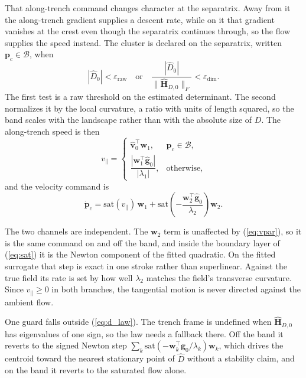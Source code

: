 \documentclass[lettersize,journal]{IEEEtran}
\begin{document}
That along-trench command changes character at the separatrix. Away from
it the along-trench gradient supplies a descent rate, while on it that
gradient vanishes at the crest even though the separatrix continues
through, so the flow supplies the speed instead. The cluster is declared
on the separatrix,
written $\mathbf{p}_c \in \mathcal{B}$, when
\begin{equation}
    |\hat{D}_0| < \varepsilon_{\mathrm{raw}}
    \quad\text{or}\quad
    \frac{|\hat{D}_0|}{\|\hat{\mathbf{H}}_{D,0}\|_F}
        < \varepsilon_{\dim}.
    \label{eq:flow_band}
\end{equation}
The first test is a raw threshold on the estimated determinant. The
second normalizes it by the local curvature, a ratio with units of length
squared, so the band scales with the landscape rather than with the
absolute size of $D$. The along-trench speed is then
\begin{equation}
    v_\parallel =
    \begin{cases}
        \hat{\mathbf{v}}_0^\top \mathbf{w}_1,
            & \mathbf{p}_c \in \mathcal{B}, \\[6pt]
        \dfrac{|\mathbf{w}_1^\top \hat{\mathbf{g}}_0|}{|\lambda_1|},
            & \text{otherwise},
    \end{cases}
    \label{eq:vpar}
\end{equation}
and the velocity command is
\begin{equation}
    \dot{\mathbf{p}}_c =
    \mathrm{sat}(v_\parallel)\,\mathbf{w}_1
    + \mathrm{sat}\!\left(-\frac{\mathbf{w}_2^\top
      \hat{\mathbf{g}}_0}{\lambda_2}\right)\mathbf{w}_2.
    \label{eq:d_law}
\end{equation}

The two channels are independent. The $\mathbf{w}_2$ term is unaffected
by (\ref{eq:vpar}), so it is the same command on and off the band, and
inside the boundary layer of (\ref{eq:sat}) it is the Newton component of
the fitted quadratic. On the fitted surrogate that step is exact in one
stroke rather than superlinear. Against the true field its rate is set by
how well $\lambda_2$ matches the field's transverse curvature. Since $v_\parallel \geq
0$ in both branches, the tangential motion is never directed against the
ambient flow. 

One guard falls outside (\ref{eq:d_law}).
The trench frame is undefined when $\hat{\mathbf{H}}_{D,0}$ has
eigenvalues of one sign, so the law needs a fallback there. Off the
band it reverts to the signed Newton step $\sum_k
\mathrm{sat}(-\mathbf{w}_k^\top\hat{\mathbf{g}}_0/\lambda_k)\mathbf{w}_k$,
which drives the centroid toward the nearest stationary point of
$\hat{D}$ without a stability claim, and on the band it reverts to the
saturated flow alone.
\end{document}
